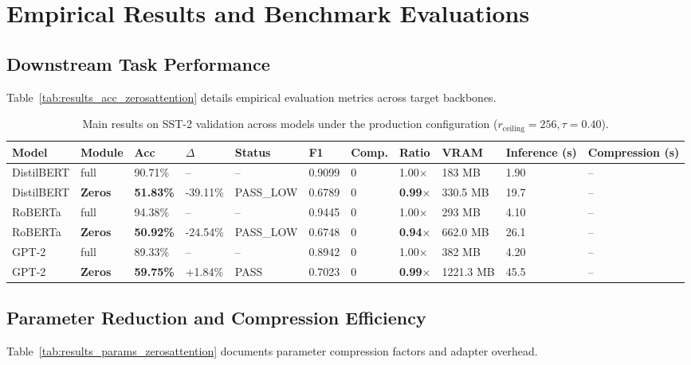 \section{Empirical Results and Benchmark Evaluations}

\subsection{Downstream Task Performance}
Table~\ref{tab:results_acc_zerosattention} details empirical evaluation metrics across target backbones.

\begin{table}[t]
\centering
\small
\begin{tabular}{lllllllllll}
\toprule
\textbf{Model} & \textbf{Module} & \textbf{Acc} & \textbf{$\Delta$} & \textbf{Status} & \textbf{F1} & \textbf{Comp.} & \textbf{Ratio} & \textbf{VRAM} & \textbf{Inference (s)} & \textbf{Compression (s)} \\
\midrule
DistilBERT & full & 90.71\% & -- & -- & 0.9099 & 0 & 1.00$\times$ & 183 MB & 1.90 & -- \\
DistilBERT & \textbf{Zeros} & \textbf{51.83\%} & -39.11\% & PASS\_LOW & 0.6789 & 0 & \textbf{0.99$\times$} & 330.5 MB & 19.7 & -- \\
RoBERTa & full & 94.38\% & -- & -- & 0.9445 & 0 & 1.00$\times$ & 293 MB & 4.10 & -- \\
RoBERTa & \textbf{Zeros} & \textbf{50.92\%} & -24.54\% & PASS\_LOW & 0.6748 & 0 & \textbf{0.94$\times$} & 662.0 MB & 26.1 & -- \\
GPT-2 & full & 89.33\% & -- & -- & 0.8942 & 0 & 1.00$\times$ & 382 MB & 4.20 & -- \\
GPT-2 & \textbf{Zeros} & \textbf{59.75\%} & +1.84\% & PASS & 0.7023 & 0 & \textbf{0.99$\times$} & 1221.3 MB & 45.5 & -- \\
\bottomrule
\end{tabular}
\caption{Main results on SST-2 validation across models under the production configuration ($r_{\mathrm{ceiling}}=256, \tau=0.40$).}
\label{tab:main_sst2}
\end{table}

\subsection{Parameter Reduction and Compression Efficiency}
Table~\ref{tab:results_params_zerosattention} documents parameter compression factors and adapter overhead.

